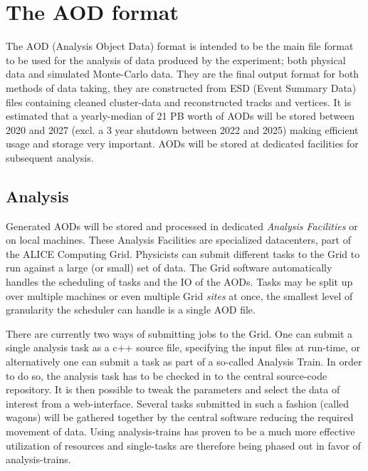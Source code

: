 \documentclass[a4paper]{report}
\begin{document}
\chapter{The AOD format}
The AOD (Analysis Object Data) format is intended to be the main file format to be used for the analysis of data produced by the experiment; both physical data and simulated Monte-Carlo data.
They are the final output format for both methods of data taking, they are constructed from ESD (Event Summary Data) files containing cleaned cluster-data and reconstructed tracks and vertices.
It is estimated that a yearly-median of 21 PB  worth of AODs will be stored between 2020 and 2027 (excl. a 3 year shutdown between 2022 and 2025) making efficient usage and storage very important.
AODs will be stored at dedicated facilities for subsequent analysis.
\section{Analysis}
Generated AODs will be stored and processed in dedicated {\em Analysis Facilities} or on local machines. These Analysis Facilities are specialized datacenters, part of the ALICE
Computing Grid. Physicists can submit different tasks to the Grid to run against a large (or small) set of data.  The Grid software automatically handles the
 scheduling of tasks and the IO of the AODs.
  Tasks may be split up over multiple machines or even multiple Grid {\em sites} at once, the smallest level of granularity the
 scheduler can handle is a single AOD file.

\par There are currently two ways of submitting jobs to the Grid. One can submit a single analysis task as a c++ source file, specifying the input files at run-time, or alternatively
one can submit a task as part of a so-called Analysis Train. In order to do so, the analysis task has to be checked in to the central source-code repository. It is
then possible to tweak the parameters and select the data of interest from a web-interface. Several tasks submitted in such a fashion (called wagons) will be gathered together by the
central software reducing the required movement of data. Using analysis-trains has proven to be a much more effective utilization of resources and single-tasks are therefore
being phased out in favor of analysis-trains.
\end{document}
